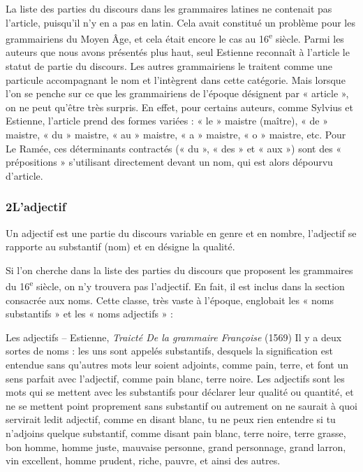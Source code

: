 La liste des parties du discours dans les grammaires latines ne contenait pas l’article, puisqu’il n’y en a pas en latin. Cela avait constitué un problème pour les grammairiens du Moyen Âge, et cela était encore le cas au 16\textsuperscript{e} siècle. Parmi les auteurs que nous avons présentés plus haut, seul Estienne reconnaît à l’article le statut de partie du discours. Les autres grammairiens le traitent comme une particule accompagnant le nom et l’intègrent dans cette catégorie. Mais lorsque l’on se penche sur ce que les grammairiens de l’époque désignent par « article », on ne peut qu’être très surpris. En effet, pour certains auteurs, comme Sylvius et Estienne, l’article prend des formes variées : « le » maistre (maître), « de » maistre, « du » maistre, « au » maistre, « a » maistre, « o » maistre, etc. Pour Le Ramée, ces déterminants contractés (« du », « des » et « aux ») sont des « prépositions » s’utilisant directement devant un nom, qui est alors dépourvu d’article.
\subsubsection*{2\quad L’adjectif}
Un adjectif est une partie du discours variable en genre et en nombre, l’adjectif se rapporte au substantif (nom) et en désigne la qualité.

Si l’on cherche dans la liste des parties du discours que proposent les grammaires du 16\textsuperscript{e} siècle, on n’y trouvera pas l’adjectif. En fait, il est inclus dans la section consacrée aux noms. Cette classe, très vaste à l’époque, englobait les « noms substantifs » et les « noms adjectifs » :
\begin{lecture}{Les adjectifs – Estienne, \textit{Traicté De la grammaire Françoise} (1569)}
Il y a deux sortes de noms : les uns sont appelés substantifs, desquels la signification est entendue sans qu’autres mots leur soient adjoints, comme pain, terre, et font un sens parfait avec l’adjectif, comme pain blanc, terre noire. Les adjectifs sont les mots qui se mettent avec les substantifs pour déclarer leur qualité ou quantité, et ne se mettent point proprement sans substantif ou autrement on ne saurait à quoi servirait ledit adjectif, comme en disant blanc, tu ne peux rien entendre si tu n’adjoins quelque substantif, comme disant pain blanc, terre noire, terre grasse, bon homme, homme juste, mauvaise personne, grand personnage, grand larron, vin excellent, homme prudent, riche, pauvre, et ainsi des autres.
\end{lecture}
